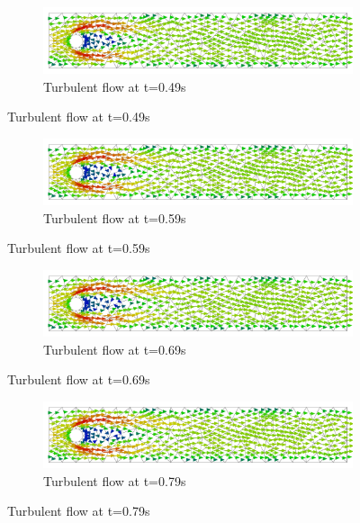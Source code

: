 \begin{figure}[H]
	\ContinuedFloat
	\begin{subfigure}{\textwidth}
    \includegraphics[width=\textwidth]{Figures/numerical_results/turbulent_gpu/turbulent_velocity_field_49.svg.pdf}
    \caption{Turbulent flow at t=0.49s}
        \end{subfigure}
\end{figure}

\begin{figure}[H]
	\ContinuedFloat
	\begin{subfigure}{\textwidth}
    \includegraphics[width=\textwidth]{Figures/numerical_results/turbulent_gpu/turbulent_velocity_field_59.svg.pdf}
    \caption{Turbulent flow at t=0.59s}
        \end{subfigure}
\end{figure}

\begin{figure}[H]
	\ContinuedFloat
	\begin{subfigure}{\textwidth}
    \includegraphics[width=\textwidth]{Figures/numerical_results/turbulent_gpu/turbulent_velocity_field_69.svg.pdf}
    \caption{Turbulent flow at t=0.69s}
        \end{subfigure}
\end{figure}

\begin{figure}[H]
	\ContinuedFloat
	\begin{subfigure}{\textwidth}
    \includegraphics[width=\textwidth]{Figures/numerical_results/turbulent_gpu/turbulent_velocity_field_79.svg.pdf}
    \caption{Turbulent flow at t=0.79s}
        \end{subfigure}
\end{figure}

